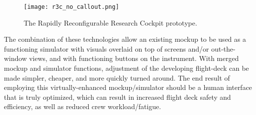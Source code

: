 \begin{figure}
    \centering
    \texttt{[image: r3c\_no\_callout.png]}
    \caption{The Rapidly Reconfigurable Research Cockpit prototype.}
    \label{fig:intro_r3c}
\end{figure}

The combination of these technologies allow an existing mockup to be used as a functioning simulator with visuals overlaid on top of screens and/or out-the-window views, and with functioning buttons on the instrument.
With merged mockup and simulator functions, adjustment of the developing flight-deck can be made simpler, cheaper, and more quickly turned around.
The end result of employing this virtually-enhanced mockup/simulator should be a human interface that is truly optimized, which can result in increased flight deck safety and efficiency, as well as reduced crew workload/fatigue.

